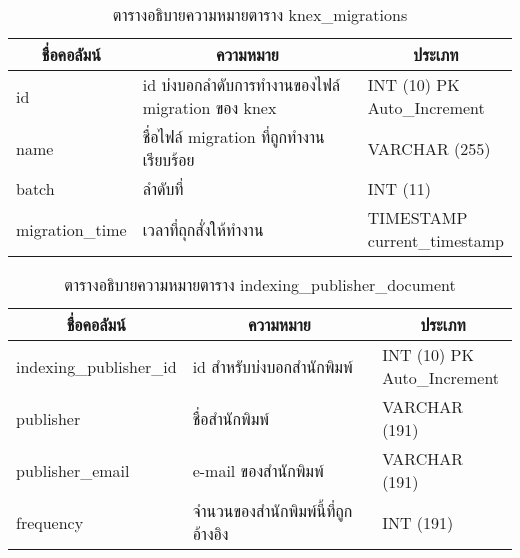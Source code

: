 \begin{table}[H]
\caption{ตารางอธิบายความหมายตาราง knex\_migrations}\label{tbl:knexmigrations}        
\begin{tabular}{|l|l|l|}
\hline
\multicolumn{1}{|c|}{ชื่อคอลัมน์} & \multicolumn{1}{c|}{ความหมาย}                      & \multicolumn{1}{c|}{ประเภท}                                                   \\ \hline
id                                & id   บ่งบอกลำดับการทำงานของไฟล์ migration ของ knex & \makecell[l]{INT   (10) PK\\Auto\_Increment} \\ \hline
name                              & ชื่อไฟล์   migration ที่ถูกทำงานเรียบร้อย          & VARCHAR   (255)                                                               \\ \hline
batch                             & ลำดับที่                                           & INT   (11)                                                                    \\ \hline
migration\_time                   & เวลาที่ถุกสั่งให้ทำงาน                             & \makecell[l]{TIMESTAMP\\current\_timestamp}  \\ \hline
\end{tabular}
\end{table}

\begin{table}[H]
\caption{ตารางอธิบายความหมายตาราง indexing\_publisher\_document}\label{tbl:indexingpublisherdocument}        
\begin{tabular}{|l|l|l|}
\hline
\multicolumn{1}{|c|}{ชื่อคอลัมน์} & \multicolumn{1}{c|}{ความหมาย}      & \multicolumn{1}{c|}{ประเภท}                                                   \\ \hline
indexing\_publisher\_id           & id สำหรับบ่งบอกสำนักพิมพ์          & \makecell[l]{INT   (10) PK\\Auto\_Increment} \\ \hline
publisher                         & ชื่อสำนักพิมพ์                     & VARCHAR   (191)                                                               \\ \hline
publisher\_email                  & e-mail   ของสำนักพิมพ์             & VARCHAR   (191)                                                               \\ \hline
frequency                         & จำนวนของสำนักพิมพ์นี้ที่ถูกอ้างอิง & INT (191)                                                                     \\ \hline
\end{tabular}
\end{table}

